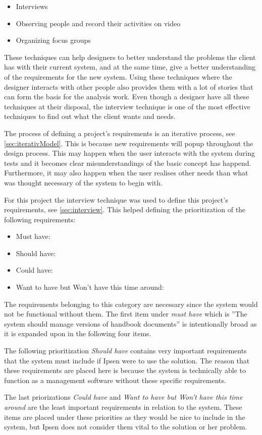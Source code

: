 \begin{itemize}
    \item Interviews
    \item Observing people and record their activities on video
    \item Organizing focus groups
\end{itemize}

These techniques can help designers to better understand the problems the client has with their current system, and at the same time, give a better understanding of the requirements for the new system.
Using these techniques where the designer interacts with other people also provides them with a lot of stories that can form the basis for the analysis work.
Even though a designer have all these techniques at their disposal, the interview technique
is one of the most effective techniques to find out what the client wants and needs.

The process of defining a project's requirements is an iterative process, see \cref{sec:iterativModel}.
This is because new requirements will popup throughout the design process.
This may happen when the user interacts with the system during tests and it becomes clear misunderstandings of the basic concept has happend.
Furthermore, it may also happen when the user realises other needs than what was thought necessary of the system to begin with.

For this project the interview technique was used to define this project's requirements, see \cref{sec:interview}. This helped defining the prioritization of the following requirements:

\begin{itemize}
	\item
		Must have:
		
		\newpage
	\item
		Should have:
		
	\item
		Could have:
		
	\item
		Want to have but Won't have this time around:
		

\end{itemize}

The requirements belonging to this category are necessary since the system would not be functional without them.
The first item under \textit{must have} which is ''The system should manage versions of handbook documents'' is intentionally broad as it is expanded upon in the following four items.

The following prioritization \textit{Should have} contains very important requirements that the system must include if Ipsen were to use the solution.
The reason that these requirements are placed here is because the system is technically able to function as a management software without these specific requirements.

The last priorizations \textit{Could have} and \textit{Want to have but Won't have this time around} are the least important requirements in relation to the system.
These items are placed under these priorities as they would be nice to include in the system, but Ipsen does not consider them vital to the solution or her problem.
